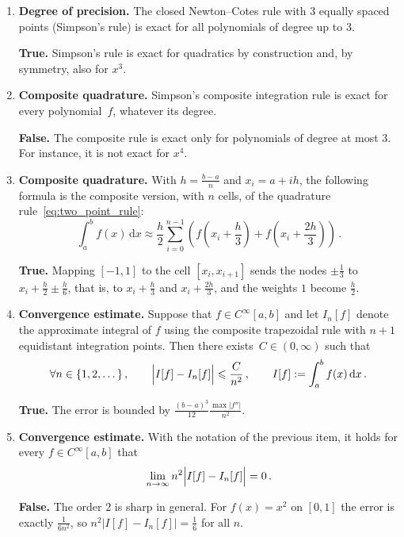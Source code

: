 \documentclass[a4paper]{article}
\renewcommand{\d}{\mathrm d}
\newcommand{\answer}[1]{%
    \ifdefined\showsolutions
        \par\smallskip
        {\small\color{blue!60!black}#1\par}
    \fi
}
\begin{document}
\begin{enumerate}
    \item
        \textbf{Degree of precision.}
        The closed Newton--Cotes rule with 3 equally spaced points (Simpson's rule) is exact for all polynomials of degree up to 3.
        \answer{\textbf{True.}
        Simpson's rule is exact for quadratics by construction and, by symmetry, also for $x^3$.}

    \item
        \textbf{Composite quadrature.}
        Simpson's composite integration rule is exact for every polynomial~$f$, whatever its degree.
        \answer{\textbf{False.}
        The composite rule is exact only for polynomials of degree at most $3$.
        For instance, it is not exact for $x^4$.}

    \item
        \textbf{Composite quadrature.}
        With $h = \frac{b-a}{n}$ and $x_i = a + ih$, the following formula is the composite version, with $n$ cells, of the quadrature rule~\eqref{eq:two_point_rule}:
        \begin{equation}
            \label{eq:composite_two_point}
            \int_a^b f(x) \, \d x \approx \frac{h}{2} \sum_{i=0}^{n-1} \left( f\left(x_i + \frac{h}{3}\right) + f\left(x_i + \frac{2h}{3}\right) \right)\,.
        \end{equation}
        \answer{\textbf{True.}
        Mapping $[-1, 1]$ to the cell $[x_i, x_{i+1}]$ sends the nodes $\pm\frac{1}{3}$ to $x_i + \frac{h}{2} \pm \frac{h}{6}$, that is, to $x_i + \frac{h}{3}$ and $x_i + \frac{2h}{3}$,
        and the weights $1$ become $\frac{h}{2}$.}

    \item
        \textbf{Convergence estimate.}
        Suppose that $f \in C^{\infty}[a, b]$ and let $I_n[f]$ denote the approximate integral of $f$ using the composite trapezoidal rule
        with $n+1$ equidistant integration points.
        Then there exists~$C \in (0, \infty)$ such that
        \[
             \forall n \in \{1, 2, \dotsc \}\,, \qquad
             \Bigl\lvert I[f] - I_n[f] \Bigr\rvert \leq \frac{C}{n^2}\,, \qquad I[f] := \int_{a}^{b} f(x) \, \d x\,.
        \]
        \answer{\textbf{True.}
        The error is bounded by $\frac{(b-a)^3}{12} \frac{\max\lvert f''\rvert}{n^2}$.}

    \item
        \textbf{Convergence estimate.}
        With the notation of the previous item, it holds for every $f \in C^{\infty}[a, b]$ that
        \[
             \lim_{n \to \infty} n^2 \Bigl\lvert I[f] - I_n[f] \Bigr\rvert = 0\,.
        \]
        \answer{\textbf{False.}
        The order $2$ is sharp in general.
        For $f(x) = x^2$ on $[0, 1]$ the error is exactly $\frac{1}{6 n^2}$, so $n^2 \lvert I[f] - I_n[f] \rvert = \frac{1}{6}$ for all $n$.}


\end{enumerate}
\end{document}
